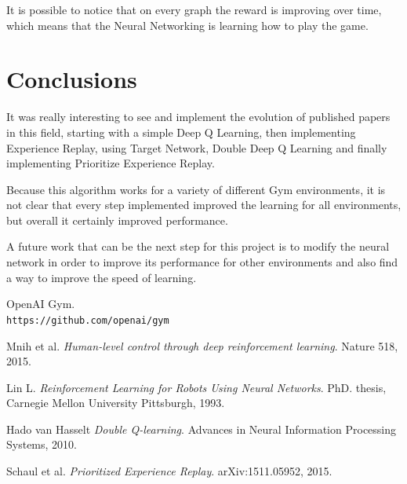 \documentclass{article}
\begin{document}
It is possible to notice that on every graph the reward is improving over time, which means that the Neural Networking is learning how to play the game.

\section{Conclusions}
It was really interesting to see and implement the evolution of published papers in this field, starting with a simple Deep Q Learning, then implementing Experience Replay, using Target Network, Double Deep Q Learning and finally implementing Prioritize Experience Replay.

Because this algorithm works for a variety of different Gym environments, it is not clear that every step implemented improved the learning for all environments, but overall it certainly improved performance.

A future work that can be the next step for this project is to modify the neural network in order to improve its performance for other environments and also find a way to improve the speed of learning.

\begin{thebibliography}{9}

OpenAI Gym.
\\\texttt{https://github.com/openai/gym}

Mnih et al.
\textit{Human-level control through deep reinforcement learning}. 
Nature 518, 2015.

Lin L.
\textit{Reinforcement Learning for Robots Using Neural Networks}. 
PhD. thesis, Carnegie Mellon University Pittsburgh, 1993.

Hado van Hasselt
\textit{Double Q-learning}.
Advances in Neural Information Processing Systems, 2010.

Schaul et al.
\textit{Prioritized Experience Replay}.
arXiv:1511.05952, 2015.

\end{thebibliography}
\end{document}
